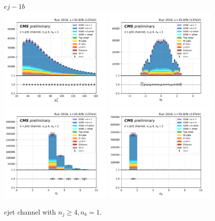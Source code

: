 \begin{figure}[ht]
    \centering
    $e j- 1b$ \\
    \includegraphics[width=0.49\textwidth]{chapters/Analysis/sectionPlots/figures/kinematics_pickles/e4j/1b/e4j_1b_lepton1_pt.pdf}
    \includegraphics[width=0.49\textwidth]{chapters/Analysis/sectionPlots/figures/kinematics_pickles/e4j/1b/e4j_1b_lepton1_eta.pdf}
    \includegraphics[width=0.49\textwidth]{chapters/Analysis/sectionPlots/figures/kinematics_pickles/e4j/1b/e4j_1b_nJets.pdf}
    \includegraphics[width=0.49\textwidth]{chapters/Analysis/sectionPlots/figures/kinematics_pickles/e4j/1b/e4j_1b_nBJets.pdf}
    
    \caption{$e$jet channel with $n_j\geq4, n_b=1$.}
\end{figure}

